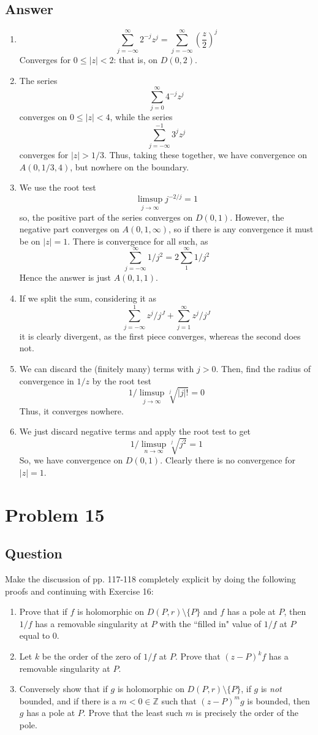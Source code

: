 \documentclass[11pt]{article}
\begin{document}
\subsection{Answer}
\begin{enumerate}
\item \[\sum_{j=-\infty}^ \infty  2^{-j} z^j = \sum_{j=-\infty}^ \infty   (\frac{z}{2})^j  \]
Converges for $0\leq |z| <2$: that is, on $D(0,2)$.
\item The series \[\sum_{j=0}^ \infty  4^{-j}z^j \] converges on $0 \leq |z|< 4$, while the series \[ \sum_{j = -\infty}^{-1} 3^j z^j  \] converges for $|z| >1/3$. Thus, taking these together, we have convergence on $A(0,1/3,4)$, but nowhere on the boundary.
\item We use the root test
\[\limsup_{j \to \infty} j^{-2 / j} = 1\]
so, the positive part of the series converges on $D(0,1)$. However, the negative part converges on $A(0,1,\infty)$, so if there is any convergence it must be on $|z|=1$. There is convergence for all such, as 
\[\sum_{j=-\infty}^\infty 1 / j^2 = 2 \sum_1^\infty 1 / j^2  \]
Hence the answer is just $A(0,1,1)$.
\item  If we split the sum, considering it as \[\sum_{j=-\infty}^ 1 z^j  / j^J + \sum_{j=1}^ \infty z^j  / j^J \] it is clearly divergent, as the first piece converges, whereas the second does not.
\item We can discard the (finitely many) terms with $j >0$. Then, find the radius of convergence in $1/z$ by the root test
\[1 / \limsup_{j \to \infty } \sqrt[j] {|j|!}  = 0\]
Thus, it converges nowhere.
\item We just discard negative terms and apply the root test to get
\[ 1/ \limsup_{n \to \infty} \sqrt[j]{j^2}  = 1\]
So, we have convergence on $D(0,1)$. Clearly there is no convergence for $|z| =1$.
\end{enumerate}

\section{Problem 15}
\subsection{Question}
Make the discussion of pp. 117-118 completely explicit by doing the following proofs and continuing with Exercise 16:
\begin{enumerate}
\item Prove that if $f$ is holomorphic on $D(P,r) \setminus \{P\}$ and $f$ has a pole at $P$, then $1/f$ has  a removable singularity at $P$ with the ``filled in" value of $1/f$ at $P$ equal to $0$.
\item Let $k$ be the order of the zero of $1/f$ at $P$. Prove that $(z-P)^kf$ has a removable singularity at $P$.
\item Conversely show that if $g$ is holomorphic on $D(P,r) \setminus \{P\}$, if $g$ is \emph{not} bounded, and if there is a $m < 0 \in \mathbb{Z}$ such that $(z-P)^m g$ is bounded, then $g$ has a pole at $P$. Prove that the least such $m$ is precisely the order of the pole.
\end{enumerate}
\end{document}
